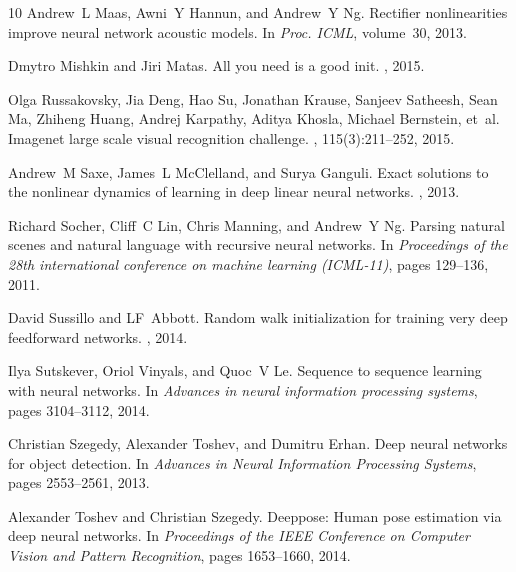 \documentclass[a4paper]{article}
\begin{document}
\begin{thebibliography}{10}
Andrew~L Maas, Awni~Y Hannun, and Andrew~Y Ng.
\newblock Rectifier nonlinearities improve neural network acoustic models.
\newblock In {\em Proc. ICML}, volume~30, 2013.

Dmytro Mishkin and Jiri Matas.
\newblock All you need is a good init.
, 2015.

Olga Russakovsky, Jia Deng, Hao Su, Jonathan Krause, Sanjeev Satheesh, Sean Ma,
  Zhiheng Huang, Andrej Karpathy, Aditya Khosla, Michael Bernstein, et~al.
\newblock Imagenet large scale visual recognition challenge.
, 115(3):211--252,
  2015.

Andrew~M Saxe, James~L McClelland, and Surya Ganguli.
\newblock Exact solutions to the nonlinear dynamics of learning in deep linear
  neural networks.
, 2013.

Richard Socher, Cliff~C Lin, Chris Manning, and Andrew~Y Ng.
\newblock Parsing natural scenes and natural language with recursive neural
  networks.
\newblock In {\em Proceedings of the 28th international conference on machine
  learning (ICML-11)}, pages 129--136, 2011.

David Sussillo and LF~Abbott.
\newblock Random walk initialization for training very deep feedforward
  networks.
, 2014.

Ilya Sutskever, Oriol Vinyals, and Quoc~V Le.
\newblock Sequence to sequence learning with neural networks.
\newblock In {\em Advances in neural information processing systems}, pages
  3104--3112, 2014.

Christian Szegedy, Alexander Toshev, and Dumitru Erhan.
\newblock Deep neural networks for object detection.
\newblock In {\em Advances in Neural Information Processing Systems}, pages
  2553--2561, 2013.

Alexander Toshev and Christian Szegedy.
\newblock Deeppose: Human pose estimation via deep neural networks.
\newblock In {\em Proceedings of the IEEE Conference on Computer Vision and
  Pattern Recognition}, pages 1653--1660, 2014.

\end{thebibliography}
\end{document}
